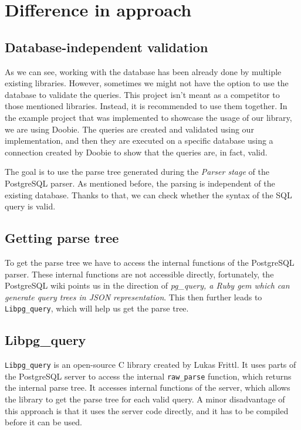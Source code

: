 \section{Difference in approach}
\subsection{Database-independent validation}
As we can see, working with the database has been already done by multiple existing libraries. However, sometimes we might not have the option to use the database to validate the queries. This project isn't meant as a competitor to those mentioned libraries. Instead, it is recommended to use them together. In the example project that was implemented to showcase the usage of our library, we are using Doobie. The queries are created and validated using our implementation, and then they are executed on a specific database using a connection created by Doobie to show that the queries are, in fact, valid.

The goal is to use the parse tree generated during the \textit{Parser stage} of the PostgreSQL parser. As mentioned before, the parsing is independent of the existing database. Thanks to that, we can check whether the syntax of the SQL query is valid. 

\subsection{Getting parse tree}
To get the parse tree we have to access the internal functions of the PostgreSQL parser. These internal functions are not accessible directly, fortunately, the PostgreSQL\cite{Postgres wiki} wiki points us in the direction of \textit{pg\_query, a Ruby gem which can generate query trees in JSON representation}. This then further leads to \texttt{Libpg\_query}, which will help us get the parse tree.

\subsection{Libpg\_query}
\texttt{Libpg\_query} is an open-source C library created by Lukas Frittl. It uses parts of the PostgreSQL server to access the internal \texttt{raw\_parse} function, which returns the internal parse tree. It accesses internal functions of the server, which allows the library to get the parse tree for each valid query. A minor disadvantage of this approach is that it uses the server code directly, and it has to be compiled before it can be used.

